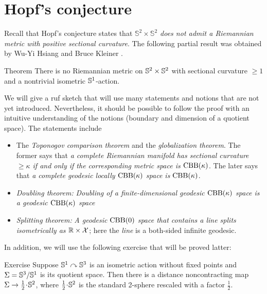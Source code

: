 \section{Hopf's conjecture}

Recall that Hopf's conjecture states that \textit{$\mathbb{S}^2\times\mathbb{S}^2$ does not admit a Riemannian metric with positive sectional curvature}.
The following partial result was obtained by Wu-Yi Hsiang and Bruce Kleiner \cite{hsiang-kleiner}.

\begin{thm}{Theorem}\label{thm:hsiang-kleiner}
There is no Riemannian metric on $\mathbb{S}^2\times\mathbb{S}^2$ with sectional curvature $\ge 1$ and a nontrivial isometric $\mathbb{S}^1$-action.
\end{thm}

We will give a ruf sketch that will use many statements and notions that are not yet introduced.
Nevertheless, it should be possible to follow the proof with an intuitive understanding of the notions (boundary and dimension of a quotient space).
The statements include 
\begin{itemize}
\item The \emph{Toponogov comparison theorem} and the \emph{globalization theorem}.
The former says  that \textit{a complete Riemannian manifold has sectional curvature $\ge \kappa$ if and only if the corresponding metric space is $\mathrm{CBB}(\kappa)$}.
The later says that \textit{a complete geodesic locally $\mathrm{CBB}(\kappa)$ space is $\mathrm{CBB}(\kappa)$}.
\item \emph{Doubling theorem:} \textit{Doubling of a finite-dimensional geodesic $\mathrm{CBB}(\kappa)$ space is a geodesic $\mathrm{CBB}(\kappa)$ space}
\item \emph{Splitting theorem:} \textit{A geodesic $\mathrm{CBB}(0)$ space that contains a line splits isometrically as $\mathbb{R}\times \mathcal{X}$};
here the \emph{line} is a both-sided infinite geodesic.
\end{itemize}

In addition, we will use the following exercise that will be proved latter:


\begin{thm}{Exercise}\label{ex:S^3/S^1}
Suppose $\mathbb{S}^1\curvearrowright\mathbb{S}^3$ is an isometric action without fixed points 
and $\Sigma=\mathbb{S}^3/\mathbb{S}^1$ is its quotient space.
Then there is a distance noncontracting map $\Sigma\to \tfrac12\cdot \SSS^2$, where $\tfrac12\cdot \SSS^2$ is the standard 2-sphere rescaled with a factor $\tfrac12$.
\end{thm}


